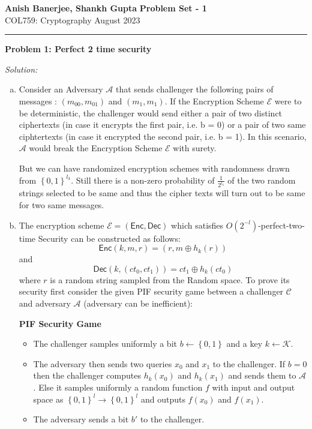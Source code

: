 \documentclass[a4paper, 11pt]{article}
\newcommand{\hr}{\noindent\rule{7in}{2.8pt}}
\newenvironment{solution}
    {\textit{Solution:}}
    {\clearpage}
\newcommand{\prob}[1]{\begin{mdframed}[backgroundcolor=gray!20] \textbf{Problem #1}\end{mdframed}}
\newcommand{\bit}{\left\{0, 1\right\}}
\newcommand{\enc}{\mathsf{Enc}}
\newcommand{\dec}{\mathsf{Dec}}
\newcommand{\calA}{\mathcal{A}}
\newcommand{\calC}{\mathcal{C}}
\newcommand{\calE}{\mathcal{E}}
\newcommand{\calK}{\mathcal{K}}
\begin{document}
\noindent
\large\textbf{Anish Banerjee, Shankh Gupta} \hfill \textbf{Problem Set - 1}   \\
\normalsize COL759: Cryptography \hfill August 2023\\
\hr


\prob{1: Perfect 2 time security}
\begin{solution}
        \begin{enumerate}[(a)]
        \item Consider an Adversary $\calA$ that sends challenger the following pairs of messages : $(m_{00}, m_{01})$ and $(m_1, m_1)$. If the Encryption Scheme $\calE$ were to be deterministic, the challenger would send either a pair of two distinct ciphertexts (in case it encrypts the first pair, i.e. b = 0) or a pair of two same ciphtertexts (in case it encrypted the second pair, i.e. b = 1). In this scenario, $\calA$ would break the Encryption Scheme $\calE$ with surety.
        
        But we can have randomized encryption schemes with randomness drawn from $\bit^{l_3}$. Still there is a non-zero probability of $\frac{1}{2^{l_3}}$ of the two random strings selected to be same and thus the cipher texts will turn out to be same for two same messages. 

        \item The encryption scheme $\calE = (\enc, \dec)$ which satisfies $ O(2^{-l}) $-perfect-two-time Security can be constructed as follows:
            $$\enc(k, m, r) = (r, m \oplus h_k(r))$$ 
            and
            $$\dec(k, (ct_0, ct_1)) = ct_1 \oplus h_k(ct_0) $$
            where $r$ is a random string sampled from the Random space.
        To prove its security first consider the given PIF security game between a challenger $\calC$ and adversary $\calA$ (adversary can be inefficient):
        \begin{center}
            \textbf{PIF Security Game}
            \begin{itemize}
                \item The challenger samples uniformly a bit $b \gets \bit$ and a key $k \gets \calK$. 
                \item The adversary then sends two queries $x_0$ and $x_1$ to the challenger. If $b = 0$ then the challenger computes $h_k(x_0)$ and $h_k(x_1)$ and sends them to $\calA$. Else it samples uniformly a random function $f$ with input and output space as $\bit^{l} \rightarrow \bit^{l}$ and outputs $f(x_0)$ and $f(x_1)$.
                \item The adversary sends a bit $b'$ to the challenger.
            \end{itemize}
        \end{center}


\end{enumerate}
\end{solution}
\end{document}
